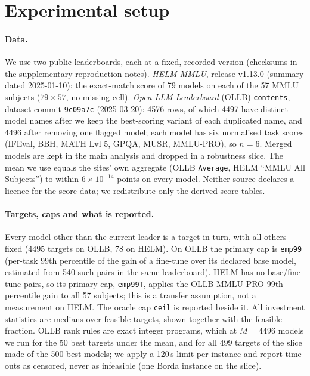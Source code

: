 \documentclass{article}
\begin{document}
\section{Experimental setup}
\label{sec:exp}
\paragraph{Data.}
We use two public leaderboards, each at a fixed, recorded version (checksums in the supplementary reproduction notes). \emph{HELM MMLU}, release v1.13.0 (summary dated 2025-01-10): the exact-match score of 79 models on each of the 57 MMLU subjects ($79\times57$, no missing cell). \emph{Open LLM Leaderboard} (OLLB) \texttt{contents}, dataset commit \texttt{9c09a7c} (2025-03-20): 4576 rows, of which 4497 have distinct model names after we keep the best-scoring variant of each duplicated name, and 4496 after removing one flagged model; each model has six normalised task scores (IFEval, BBH, MATH Lvl 5, GPQA, MUSR, MMLU-PRO), so $n=6$. Merged models are kept in the main analysis and dropped in a robustness slice. The mean we use equals the sites' own aggregate (OLLB \texttt{Average}, HELM ``MMLU All Subjects'') to within $6\times10^{-14}$ points on every model. Neither source declares a licence for the score data; we redistribute only the derived score tables.

\paragraph{Targets, caps and what is reported.}
Every model other than the current leader is a target in turn, with all others fixed (4495 targets on OLLB, 78 on HELM). On OLLB the primary cap is \texttt{emp99} (per-task 99th percentile of the gain of a fine-tune over its declared base model, estimated from 540 such pairs in the same leaderboard). HELM has no base/fine-tune pairs, so its primary cap, \texttt{emp99T}, applies the OLLB MMLU-PRO 99th-percentile gain to all 57 subjects; this is a transfer assumption, not a measurement on HELM. The oracle cap \texttt{ceil} is reported beside it. All investment statistics are medians over feasible targets, shown together with the feasible fraction. OLLB rank rules are exact integer programs, which at $M=4496$ models we run for the 50 best targets under the mean, and for all 499 targets of the slice made of the 500 best models; we apply a 120\,s limit per instance and report time-outs as censored, never as infeasible (one Borda instance on the slice).
\end{document}

